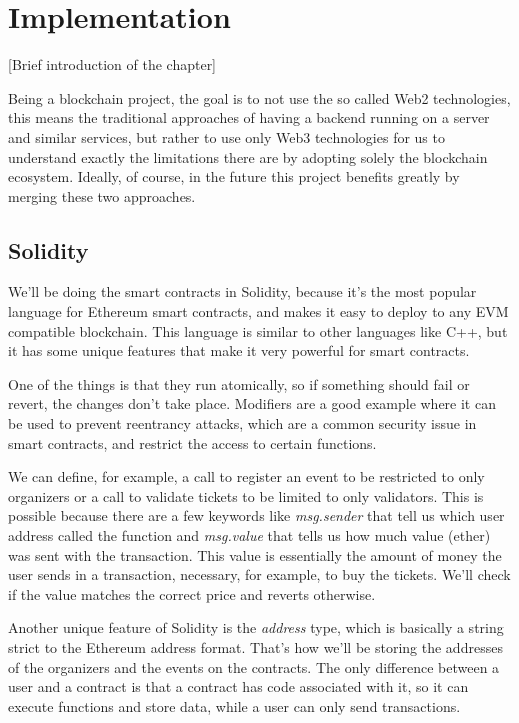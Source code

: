 \chapter{Implementation}
\label{ch:implementation}

[Brief introduction of the chapter]

Being a blockchain project, the goal is to not use the so called Web2 technologies, this means the traditional approaches of having a backend running on a server and similar services, but rather to use only Web3 technologies for us to understand exactly the limitations there are by adopting solely the blockchain ecosystem. Ideally, of course, in the future this project benefits greatly by merging these two approaches.

\section{Solidity}

We'll be doing the smart contracts in Solidity, because it's the most popular language for Ethereum smart contracts, and makes it easy to deploy to any EVM compatible blockchain. This language is similar to other languages like C++, but it has some unique features that make it very powerful for smart contracts.

One of the things is that they run atomically, so if something should fail or revert, the changes don't take place. Modifiers are a good example where it can be used to prevent reentrancy attacks, which are a common security issue in smart contracts, and restrict the access to certain functions.

We can define, for example, a call to register an event to be restricted to only organizers or a call to validate tickets to be limited to only validators. This is possible because there are a few keywords like \textit{msg.sender} that tell us which user address called the function and \textit{msg.value} that tells us how much value (ether) was sent with the transaction. This value is essentially the amount of money the user sends in a transaction, necessary, for example, to buy the tickets. We'll check if the value matches the correct price and reverts otherwise.

Another unique feature of Solidity is the \textit{address} type, which is basically a string strict to the Ethereum address format. That's how we'll be storing the addresses of the organizers and the events on the contracts. The only difference between a user and a contract is that a contract has code associated with it, so it can execute functions and store data, while a user can only send transactions.


